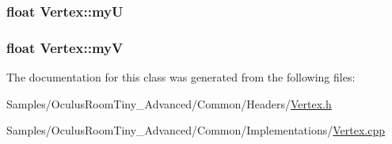 \subsubsection[{\texorpdfstring{myU}{myU}}]{\setlength{\rightskip}{0pt plus 5cm}float Vertex\+::myU\hspace{0.3cm}{\ttfamily [protected]}}\hypertarget{class_vertex_af2e791591e89e6f39ad37329708f7470}{}\label{class_vertex_af2e791591e89e6f39ad37329708f7470}
\subsubsection[{\texorpdfstring{myV}{myV}}]{\setlength{\rightskip}{0pt plus 5cm}float Vertex\+::myV\hspace{0.3cm}{\ttfamily [protected]}}\hypertarget{class_vertex_a4b26884b35841183664354eba0287aac}{}\label{class_vertex_a4b26884b35841183664354eba0287aac}


The documentation for this class was generated from the following files\+:\begin{DoxyCompactItemize}
\item 
Samples/\+Oculus\+Room\+Tiny\+\_\+\+Advanced/\+Common/\+Headers/\hyperlink{_vertex_8h}{Vertex.\+h}\item 
Samples/\+Oculus\+Room\+Tiny\+\_\+\+Advanced/\+Common/\+Implementations/\hyperlink{_vertex_8cpp}{Vertex.\+cpp}\end{DoxyCompactItemize}
